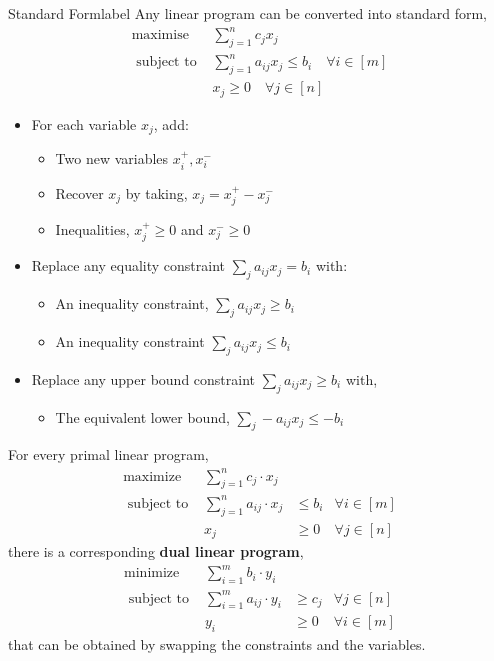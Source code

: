 	\begin{ex}{Standard Form}{label}
		Any linear program can be converted into standard form,
		\[
		\begin{array}{ll}
		\operatorname{maximise} & \sum_{j=1}^{n} c_{j} x_{j} \\
		\text { subject to } & \sum_{j=1}^{n} a_{i j} x_{j} \leq b_{i} \quad \forall i \in[m] \\
		& x_{j}  \geq 0  \quad \forall j \in[n]
		\end{array}
		\]
		\begin{itemize}
			\item For each variable $x_j$, add:
				\begin{itemize}
					\item Two new variables $x_i^+, x_i^-$
					\item Recover $x_j$ by taking, $x_j = x_j^+ - x_j^-$
					\item Inequalities, $x_j^+ \geq 0$ and $x_j^- \geq 0$
				\end{itemize}
			\item Replace any equality constraint $\sum_j a_{ij}x_j = b_i$ with:
				\begin{itemize}
					\item An inequality constraint, $\sum_j a_{ij}x_j \geq b_i$
					\item An inequality constraint $\sum_j a_{ij}x_j \leq b_i$
				\end{itemize}
			\item Replace any upper bound constraint $\sum_j a_{ij}x_j \geq b_i$ with,
					\begin{itemize}
						\item The equivalent lower bound, $\sum_j -a_{ij}x_j \leq -b_i$
					\end{itemize}
			\end{itemize}
	\end{ex}

		\begin{defn}
			For every primal linear program,
			\[
			\begin{array}{lrlr}
			\operatorname{maximize} & \sum_{j=1}^{n} c_{j} \cdot x_{j} & & \\
			\text { subject to } & \sum_{j=1}^{n} a_{i j} \cdot x_{j} & \leq b_{i} &\forall i \in[m] \\
			& x_{j} & \geq 0 & \forall j \in[n]
			\end{array}
			\]
			\noindent there is a corresponding \textbf{dual linear program},
			\[
			\begin{array}{lrlr}

			\operatorname{minimize} & \sum_{i=1}^{m} b_{i} \cdot y_{i} & & \\
			\text { subject to } & \sum_{i=1}^{m} a_{i j} \cdot y_{i} & \geq c_{j} & \forall j \in[n] \\
			& y_{i} & \geq 0 & \forall i \in[m]
			\end{array}
			\]
			 that can be obtained by swapping the constraints and the variables.
		\end{defn}

